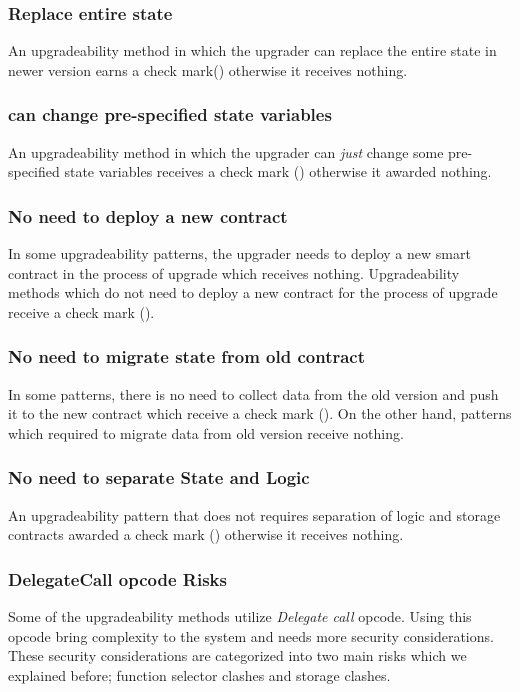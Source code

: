 \subsubsection{Replace entire state}
An upgradeability method in which the upgrader can replace the entire state in newer version earns a check mark(\checkmark) otherwise it receives nothing.

\subsubsection{can change pre-specified state variables}
An upgradeability method in which the upgrader can \emph{just} change some pre-specified state variables receives a check mark (\checkmark) otherwise it awarded nothing.

\subsubsection{No need to deploy a new contract}
In some upgradeability patterns, the upgrader needs to deploy a new smart contract in the process of upgrade which receives nothing. Upgradeability methods which do not need to deploy a new contract for the process of upgrade receive a check mark (\checkmark).

\subsubsection{No need to migrate state from old contract}
In some patterns, there is no need to collect data from the old version and push it to the new contract which receive a check mark (\checkmark). On the other hand, patterns which required to migrate data from old version receive nothing.

\subsubsection{No need to separate State and Logic}
An upgradeability pattern that does not requires separation of logic and storage contracts awarded a check mark (\checkmark) otherwise it receives nothing.


\subsubsection{DelegateCall opcode Risks}
Some of the upgradeability methods utilize \textit{Delegate call} opcode. Using  this opcode bring complexity to the system and needs more security considerations. These security considerations are categorized into two main risks which we explained before; function selector clashes and storage clashes.

